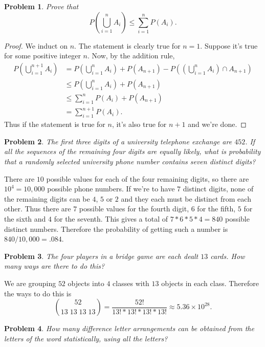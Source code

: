 \documentclass{article}
\newtheorem{problem}{Problem}
\begin{document}
\begin{problem}
Prove that
\[
P \left ( \bigcup_{i=1}^{n} A_i \right ) \leq \sum_{i=1}^{n} P(A_i).
\]
\end{problem}
\begin{proof}
We induct on $n$. The statement is clearly true for $n=1$. Suppose it's true for some positive integer $n$. Now, by the addition rule,
\begin{align*}
P \left (\bigcup_{i=1}^{n+1} A_i \right )
&= P \left ( \bigcup_{i=1}^{n} A_i \right ) + P(A_{n+1}) - P \left ( \left ( \bigcup_{i=1}^{n} A_i \right ) \cap A_{n+1} \right )\\
&\leq P \left ( \bigcup_{i=1}^{n} A_i \right ) + P(A_{n+1})\\
&\leq \sum_{i=1}^{n} P(A_i) + P(A_{n+1})\\
&= \sum_{i=1}^{n+1} P(A_i).
\end{align*}
Thus if the statement is true for $n$, it's also true for $n+1$ and we're done.
\end{proof}

\begin{problem}
The first three digits of a university telephone exchange are $452$. If all the sequences of the remaining four digits are equally likely, what is probability that a randomly selected university phone number contains seven distinct digits?
\end{problem}

There are $10$ possible values for each of the four remaining digits, so there are $10^4 = 10,000$ possible phone numbers. If we're to have $7$ distinct digits, none of the remaining digits can be $4$, $5$ or $2$ and they each must be distinct from each other. Thus there are $7$ possible values for the fourth digit, $6$ for the fifth, $5$ for the sixth and $4$ for the seventh. This gives a total of $7*6*5*4 = 840$ possible distinct numbers. Therefore the probability of getting such a number is $840/10,000 = .084$.

\begin{problem}
The four players in a bridge game are each dealt $13$ cards. How many ways are there to do this?
\end{problem}

We are grouping $52$ objects into $4$ classes with $13$ objects in each class. Therefore the ways to do this is
\[
\binom{52}{13 \; 13 \; 13 \; 13} = \frac{52!}{13!*13!*13!*13!} \approx 5.36 \times 10^{28}.
\]

\begin{problem}
How many difference letter arrangements can be obtained from the letters of the word \emph{statistically}, using all the letters?
\end{problem}
\end{document}
